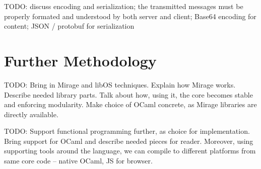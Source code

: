 TODO: discuss encoding and serialization; the transmitted messages must be properly formated and understood by both server and client; Base64 encoding for content; JSON / protobuf for serialization

\section{Further Methodology}
TODO: Bring in Mirage and libOS techniques. Explain how Mirage works. Describe needed library parts. Talk about how, using it, the core becomes stable and enforcing modularity. Make choice of OCaml concrete, as Mirage libraries are directly available.

TODO: Support functional programming further, as choice for implementation. Bring support for OCaml and describe needed pieces for reader. Moreover, using supporting tools around the language, we can compile to different platforms from same core code -- native OCaml, JS for browser.
